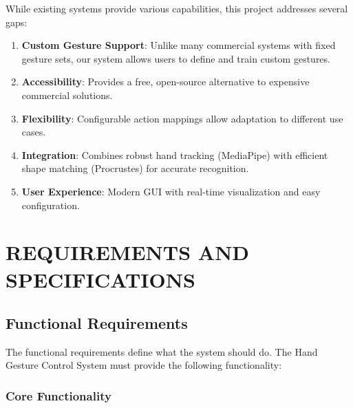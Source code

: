 \documentclass[12pt,a4paper]{report}
\begin{document}
While existing systems provide various capabilities, this project addresses several gaps:

\begin{enumerate}
    \item \textbf{Custom Gesture Support}: Unlike many commercial systems with fixed gesture sets, our system allows users to define and train custom gestures.
    
    \item \textbf{Accessibility}: Provides a free, open-source alternative to expensive commercial solutions.
    
    \item \textbf{Flexibility}: Configurable action mappings allow adaptation to different use cases.
    
    \item \textbf{Integration}: Combines robust hand tracking (MediaPipe) with efficient shape matching (Procrustes) for accurate recognition.
    
    \item \textbf{User Experience}: Modern GUI with real-time visualization and easy configuration.
\end{enumerate}

\chapter{REQUIREMENTS AND SPECIFICATIONS}

\section{Functional Requirements}

The functional requirements define what the system should do. The Hand Gesture Control System must provide the following functionality:

\subsection{Core Functionality}
\end{document}
